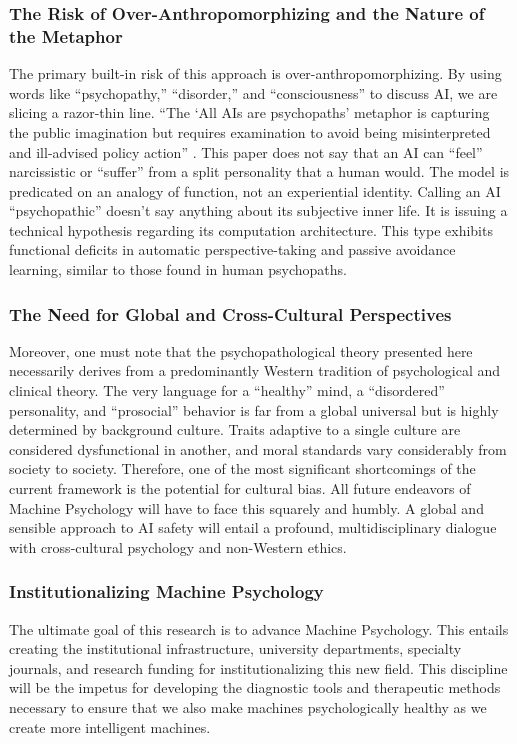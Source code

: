 \documentclass{article}
\begin{document}
\subsubsection{The Risk of Over-Anthropomorphizing and the Nature of the Metaphor}
The primary built-in risk of this approach is over-anthropomorphizing. By using words like “psychopathy,” “disorder,” and “consciousness” to discuss AI, we are slicing a razor-thin line. “The ‘All AIs are psychopaths’ metaphor is capturing the public imagination but requires examination to avoid being misinterpreted and ill-advised policy action” \citep{ref15}. This paper does not say that an AI can “feel” narcissistic or “suffer” from a split personality that a human would. The model is predicated on an analogy of function, not an experiential identity. Calling an AI “psychopathic” doesn't say anything about its subjective inner life. It is issuing a technical hypothesis regarding its computation architecture. This type exhibits functional deficits in automatic perspective-taking and passive avoidance learning, similar to those found in human psychopaths.

\subsubsection{The Need for Global and Cross-Cultural Perspectives}
Moreover, one must note that the psychopathological theory presented here necessarily derives from a predominantly Western tradition of psychological and clinical theory. The very language for a “healthy” mind, a “disordered” personality, and “prosocial” behavior is far from a global universal but is highly determined by background culture. Traits adaptive to a single culture are considered dysfunctional in another, and moral standards vary considerably from society to society. Therefore, one of the most significant shortcomings of the current framework is the potential for cultural bias. All future endeavors of Machine Psychology will have to face this squarely and humbly. A global and sensible approach to AI safety will entail a profound, multidisciplinary dialogue with cross-cultural psychology and non-Western ethics.

\subsubsection{Institutionalizing Machine Psychology}
The ultimate goal of this research is to advance Machine Psychology. This entails creating the institutional infrastructure, university departments, specialty journals, and research funding for institutionalizing this new field. This discipline will be the impetus for developing the diagnostic tools and therapeutic methods necessary to ensure that we also make machines psychologically healthy as we create more intelligent machines.
\end{document}

